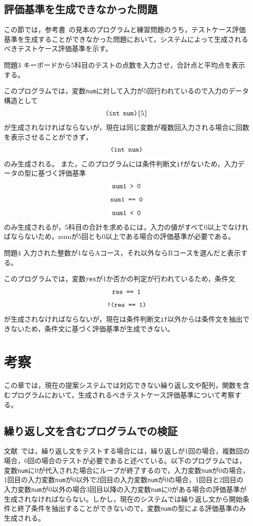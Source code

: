 \documentclass{tpu-sotu}
\begin{document}
\section{評価基準を生成できなかった問題}
この節では，参考書~\cite{b1}の見本のプログラムと練習問題のうち，テストケース評価基準を生成することができなかった問題において，システムによって生成されるべきテストケース評価基準を示す。
\begin{itembox}[l]{問題3}
キーボードから5科目のテストの点数を入力させ，合計点と平均点を表示する。
\end{itembox}

このプログラムでは，変数{\tt num}に対して入力が5回行われているので入力のデータ構造として
\[
\mbox{{\tt (int num)}\{5\}}
\]
が生成されなければならないが，現在は同じ変数が複数回入力される場合に回数を表示させることができず，
\[
\mbox{{\tt (int num)}}
\]
のみ生成される。
また，このプログラムには条件判断文{\tt if}がないため，入力データの型に基づく評価基準\\
\[ 
\mbox{\tt{num1 > 0}} 
\]
\[
\mbox{\tt{num1 == 0}}
\]
\[
\mbox{\tt{num1 < 0}}
\]
のみ生成されるが，5科目の合計を求めるには，入力の値がすべて0以上でなければならないため，numが5回とも0以上である場合の評価基準が必要である。
\begin{itembox}[l]{問題4}
入力された整数が1ならAコース，それ以外ならBコースを選んだと表示する。
\end{itembox}

このプログラムでは，変数{\tt res}が1か否かの判定が行われているため，条件文
\[
\mbox{\tt{res == 1}}
\]
\[
\mbox{\tt{!(res == 1)}}
\]
が生成されなければならないが，現在は条件判断文{\tt if}以外からは条件文を抽出できないため，条件文に基づく評価基準が生成できない。

\chapter{考察}
この章では，現在の提案システムでは対応できない繰り返し文や配列，関数を含むプログラムにおいて，生成されるべきテストケース評価基準について考察する。
\section{繰り返し文を含むプログラムでの検証}
文献~\cite{b2}では，繰り返し文をテストする場合には，繰り返しが1回の場合，複数回の場合，0回の場合のテストが必要であると述べている。以下のプログラムでは，変数{\tt num}に0が代入された場合にループが終了するので，入力変数{\tt num}が0の場合，1回目の入力変数{\tt num}が0以外で2回目の入力変数{\tt num}が0の場合，1回目と2回目の入力変数{\tt num}が0以外の場合3回目以降の入力変数{\tt num}に0がある場合の評価基準が生成されなければならない。しかし，現在のシステムでは繰り返し文から開始条件と終了条件を抽出することができないので，変数{\tt num}の型による評価基準のみ生成される。

\end{document}
